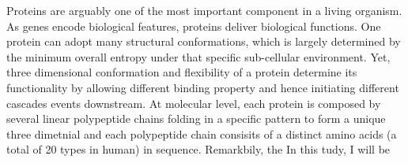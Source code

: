 Proteins are arguably one of the most important component in a living organism. As genes encode biological features, proteins deliver biological functions. One protein can adopt many structural conformations, which is largely determined by the minimum overall entropy under that specific sub-cellular environment. Yet, three dimensional conformation and flexibility of a protein determine its functionality by allowing different binding property and hence initiating different cascades events downstream. At molecular level, each protein is composed by several linear polypeptide chains folding in a specific pattern to form a unique three dimetnial  and each polypeptide chain consisits of a distinct amino acids (a total of 20 types in human) in sequence. Remarkbily, the  In this tudy, I will be 